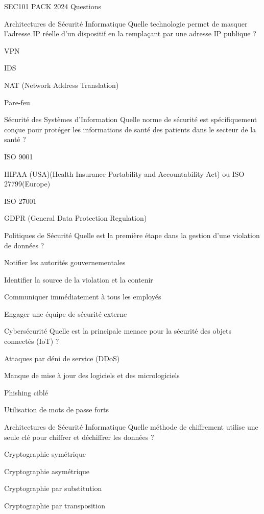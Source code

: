 \documentclass[12pt]{article}
\begin{document}
\begin{quiz}{SEC101 PACK 2024 Questions}
\begin{multi}[points=1]{Architectures de Sécurité Informatique}
  Quelle technologie permet de masquer l'adresse IP réelle d'un dispositif en la remplaçant par une adresse IP publique ?
  \item VPN
  \item IDS
  \item* NAT (Network Address Translation)
  \item Pare-feu
\end{multi}

\begin{multi}[points=1]{Sécurité des Systèmes d'Information}
  Quelle norme de sécurité est spécifiquement conçue pour protéger les informations de santé des patients dans le secteur de la santé ?
  \item ISO 9001
  \item* HIPAA (USA)(Health Insurance Portability and Accountability Act) ou ISO 27799(Europe)
  \item ISO 27001
  \item GDPR (General Data Protection Regulation)
\end{multi}

\begin{multi}[points=1]{Politiques de Sécurité}
  Quelle est la première étape dans la gestion d'une violation de données ?
  \item Notifier les autorités gouvernementales
  \item* Identifier la source de la violation et la contenir
  \item Communiquer immédiatement à tous les employés
  \item Engager une équipe de sécurité externe
\end{multi}

\begin{multi}[points=1]{Cybersécurité}
  Quelle est la principale menace pour la sécurité des objets connectés (IoT) ?
  \item Attaques par déni de service (DDoS)
  \item* Manque de mise à jour des logiciels et des micrologiciels
  \item Phishing ciblé
  \item Utilisation de mots de passe forts
\end{multi}

\begin{multi}[points=1]{Architectures de Sécurité Informatique}
  Quelle méthode de chiffrement utilise une seule clé pour chiffrer et déchiffrer les données ?
  \item* Cryptographie symétrique
  \item Cryptographie asymétrique
  \item Cryptographie par substitution
  \item Cryptographie par transposition
\end{multi}


\end{quiz}
\end{document}
